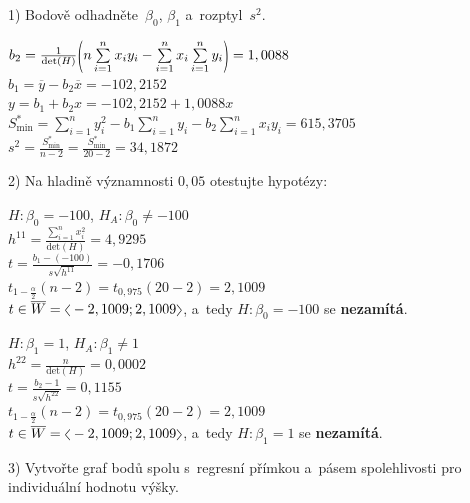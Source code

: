 \documentclass[a4paper, 11pt]{article}
\newcommand{\intlr}[1]{\scaleleftright[1ex]{<}{#1}{>}}
\newcommand{\intopen}[1]{\scaleleftright[1ex]{(}{#1}{)}}
\begin{document}
	\vspace{1em}
	1) Bodově odhadněte~$ \beta_0 $, $ \beta_1 $ a~rozptyl~$ s^2 $.
	\vspace{1em}

	$ b_2 = \frac{1}{\mathrm{det}(H)} \intopen{n \sum\limits_{i = 1}^n
	x_i y_i - \sum\limits_{i = 1}^n x_i \sum\limits_{i = 1}^n y_i} =
	1,0088 $ \\
	$ b_1 = \overline{y} - b_2 \overline{x} = -102,2152 $ \\
	$ y = b_1 + b_2 x = -102,2152 + 1,0088 x $ \\
	$ S_{\mathrm{min}}^* = \sum\limits_{i = 1}^n y_i^2 - b_1
	\sum\limits_{i = 1}^n y_i - b_2 \sum\limits_{i = 1}^n x_i y_i =
	615,3705 $ \\
	$ s^2 = \frac{S_{\mathrm{min}}^*}{n - 2} = \frac{S_{\mathrm{min}}^*}{20
	- 2} = 34,1872 $

	\vspace{1em}
	2) Na hladině významnosti $ 0, 05 $ otestujte hypotézy:
	\vspace{1em}

	$ H : \beta_0 = -100 $, $ H_A : \beta_0 \neq -100 $ \\
	$ h^{11} = \frac{\sum\limits_{i = 1}^n x_i^2}{\mathrm{det}(H)} =
	4,9295 $ \\
	$ t = \frac{b_1 - (-100)}{s \sqrt{h^{11}}} = -0,1706 $ \\
	$ t_{1 - \frac{\alpha}{2}}(n - 2) = t_{0,975}(20 - 2) = 2,1009 $ \\
	$ t \in \overline{W} = \intlr{-2,1009; 2,1009} $, a~tedy $ H :
	\beta_0 = -100 $ se \textbf{nezamítá}.

	\vspace{1em}

	$ H : \beta_1 = 1 $, $ H_A : \beta_1 \neq 1 $ \\
	$ h^{22} = \frac{n}{\mathrm{det}(H)} = 0,0002 $ \\
	$ t = \frac{b_2 - 1}{s \sqrt{h^{22}}} = 0,1155 $ \\
	$ t_{1 - \frac{\alpha}{2}}(n - 2) = t_{0,975}(20 - 2) = 2,1009 $ \\
	$ t \in \overline{W} = \intlr{-2,1009; 2,1009} $, a~tedy $ H :
	\beta_1 = 1 $ se \textbf{nezamítá}.

	\newpage
	\vspace{1em}
	3) Vytvořte graf bodů spolu s~regresní přímkou a~pásem spolehlivosti
	pro individuální hodnotu výšky.
	\vspace{1em}
\end{document}
